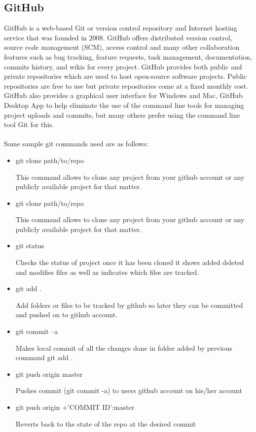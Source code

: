 \subsection{GitHub}
GitHub is a web-based Git or version control repository and Internet hosting service that was founded in 2008. GitHub offers distributed version control,
source code management (SCM), access control and many other collaboration features such as bug tracking, feature requests, task management, documentation, commits history, and wikis for every project\cite{KlintFinley}. GitHub provides both public and private repositories which are used to
host open-source software projects. Public repositories are free to use but private repositories come at a fixed monthly cost. GitHub also provides a graphical user interface for Windows and Mac, GitHub Desktop App to help eliminate the use of the command line tools for managing project uploads and commits, but many others prefer using the command line tool Git for this.\\
\\
Some sample git commands used are as follows:
\begin{itemize}
    \item git clone path/to/repo\par
    This command allows to clone any project from your github account
    or any publicly available project for that matter.

    \item git clone path/to/repo\par
    This command allows to clone any project from your github account
    or any publicly available project for that matter.
    
    \item git status\par
    Checks the status of project once it has been cloned it shows
    added deleted and modifies files as well as indicates which files
    are tracked.
    
    \item git add .\par
    Add folders or files to be tracked by github so later they can be
    committed and pushed on to github account.
    
    \item git commit –a\par
    Makes local commit of all the changes done in folder added by
    previous command git add .
    
    \item git push origin master\par
    Pushes commit (git commit -a) to users github account on his/her
    account
    
    \item git push origin +'COMMIT ID':master\par
    Reverts back to the state of the repo at the desired commit
\end{itemize}

